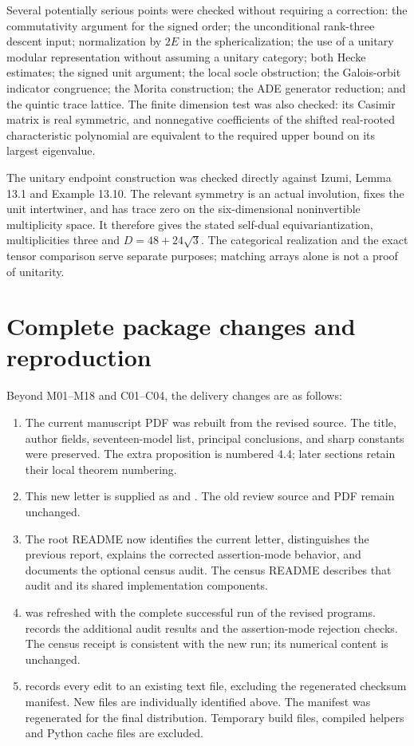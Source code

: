 \documentclass[11pt,a4paper]{article}
\begin{document}
Several potentially serious points were checked without requiring a
correction: the commutativity argument for the signed order; the
unconditional rank-three descent input; normalization by $2E$ in the
sphericalization; the use of a unitary modular representation without
assuming a unitary category; both Hecke estimates; the signed unit
argument; the local socle obstruction; the Galois-orbit indicator
congruence; the Morita construction; the ADE generator reduction; and
the quintic trace lattice. The finite dimension test was also checked:
its Casimir matrix is real symmetric, and nonnegative coefficients of
the shifted real-rooted characteristic polynomial are equivalent to
the required upper bound on its largest eigenvalue.

The unitary endpoint construction was checked directly against Izumi,
Lemma 13.1 and Example 13.10. The relevant symmetry is an actual
involution, fixes the unit intertwiner, and has trace zero on the
six-dimensional noninvertible multiplicity space. It therefore gives
the stated self-dual equivariantization, multiplicities three and
$D=48+24\sqrt3$. The categorical realization and the exact tensor
comparison serve separate purposes; matching arrays alone is not a
proof of unitarity.

\section{Complete package changes and reproduction}\label{sec:package}

Beyond M01--M18 and C01--C04, the delivery changes are as follows:
\begin{enumerate}
\item The current manuscript PDF was rebuilt from the revised source.
The title, author fields, seventeen-model list, principal conclusions,
and sharp constants were preserved. The extra proposition is numbered
4.4; later sections retain their local theorem numbering.
\item This new letter is supplied as  and
. The old review source and PDF remain unchanged.
\item The root README now identifies the current letter, distinguishes
the previous report, explains the corrected assertion-mode behavior,
and documents the optional census audit. The census README describes
that audit and its shared implementation components.
\item {} was refreshed with the complete successful
run of the revised programs.  records
the additional audit results and the assertion-mode rejection checks.
The census receipt is consistent with the new run; its numerical
content is unchanged.
\item {} records every edit to an existing text file,
excluding the regenerated checksum manifest. New files are individually
identified above. The manifest  was regenerated for
the final distribution. Temporary build files, compiled helpers and
Python cache files are excluded.
\end{enumerate}
\end{document}
